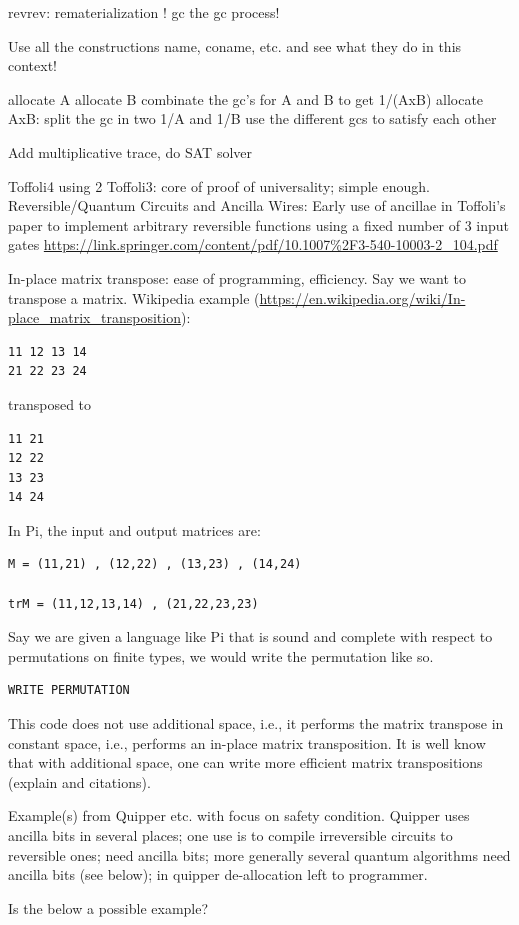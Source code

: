 \documentclass[sigplan,10pt,review,anonymous]{acmart}
\begin{document}
revrev: rematerialization ! gc the gc process! 

Use all the constructions name, coname, etc. and see what they do in this context!  
 
allocate A
allocate B
combinate the gc's for A and B to get 1/(AxB)
allocate AxB: split the gc in two 1/A and 1/B
use the different gcs to satisfy each other

Add multiplicative trace, do SAT solver

Toffoli4 using 2 Toffoli3: core of proof of universality; simple
enough. Reversible/Quantum Circuits and Ancilla Wires: Early use of
ancillae in Toffoli's paper to implement arbitrary reversible
functions using a fixed number of 3 input gates
\url{https://link.springer.com/content/pdf/10.1007%2F3-540-10003-2_104.pdf}

In-place matrix transpose: ease of programming, efficiency. Say we
want to transpose a matrix. Wikipedia example
(\url{https://en.wikipedia.org/wiki/In-place_matrix_transposition}):
\begin{verbatim}
11 12 13 14 
21 22 23 24 
\end{verbatim}
transposed to
\begin{verbatim}
11 21
12 22
13 23
14 24
\end{verbatim}
In Pi, the input and output matrices are:
\begin{verbatim}
M = (11,21) , (12,22) , (13,23) , (14,24) 

trM = (11,12,13,14) , (21,22,23,23) 
\end{verbatim}
Say we are given a language like Pi that is sound and complete with
respect to permutations on finite types, we would write the
permutation like so.
\begin{verbatim}
WRITE PERMUTATION
\end{verbatim}
This code does not use additional space, i.e., it performs the matrix
transpose in constant space, i.e., performs an in-place matrix
transposition. It is well know that with additional space, one can
write more efficient matrix transpositions (explain and citations).

Example(s) from Quipper etc. with focus on safety condition. Quipper
uses ancilla bits in several places; one use is to compile
irreversible circuits to reversible ones; need ancilla bits; more
generally several quantum algorithms need ancilla bits (see below); in
quipper de-allocation left to programmer.

Is the below a possible example?
\end{document}
